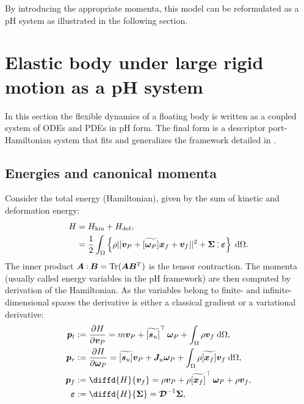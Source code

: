 \documentclass{svjour3}                     %
\DeclareMathOperator{\Tr}{Tr}
\newcommand{\crmat}[1]{\ensuremath{\widetilde{\left[#1\right]}}}
\def\onedot{$\mathsurround0pt\ldotp$}
\def\cddot{%
	\mathbin{\vcenter{\baselineskip.67ex
			\hbox{\onedot}\hbox{\onedot}}%
}}
\begin{document}
	By introducing the appropriate momenta, this model can be reformulated as a pH system as illustrated in the following section.
	
	
	\section{Elastic body under large rigid motion as a pH system}
	\label{sec:pH_fd}
	In this section the flexible dynamics of a floating body is written as a coupled system of ODEs and PDEs in pH form. The final form is a descriptor port-Hamiltonian system that fits and generalizes the framework detailed in \cite{beattie2018linear,mehrmann2019structurepreserving}.  
	
	\subsection{Energies and canonical momenta}
	Consider the total energy (Hamiltonian), given by the sum of kinetic and deformation energy:
	\begin{equation}
	\label{eq:H}
	\begin{aligned}
	H &= H_{\text{kin}} + H_{\text{def}}, \\
	&= \frac{1}{2} \int_{\Omega} \left\{\rho ||\bm{v}_P + \crmat{\bm{\omega}_P} \bm{x}_f + {\bm{v}}_f||^2 + \bm\Sigma \cddot \bm\varepsilon \right\}  \d{\Omega}.
	\end{aligned}
	\end{equation}
	The inner product $\bm{A} \cddot \bm{B} = \Tr(\bm{A} \bm{B}^T)$ is the tensor contraction.  
	The momenta (usually called energy variables in the pH framework) are then computed by derivation of the Hamiltonian. As the variables belong to finite- and infinite-dimensional spaces the derivative is either a classical gradient or a variational derivative:
	\begin{equation}
	\label{eq:momenta}
	\begin{aligned}
	\bm{p}_t &:= \diffp{H}{\bm{v}_P} = m \bm{v}_P + \crmat{\bm{s}_u}^\top \, \bm\omega_P + \int_{\Omega} \rho \bm{v}_f \d{\Omega}, \\
	\bm{p}_r &:= \diffp{H}{\bm\omega_P} = \crmat{\bm{s}_u} \bm{v}_P + \bm{J}_u \bm\omega_P + \int_{\Omega} \rho \crmat{\bm{x}_f} \bm{v}_f \d{\Omega}, \\
	\bm{p}_f &:= \diffd{H}{\bm{v}_f} = \rho \bm{v}_P + \rho \crmat{\bm{x}_f}^\top \, \bm\omega_P + \rho \bm{v}_f, \\
	\bm\varepsilon &:= \diffd{H}{\bm\Sigma} = \bm{\mathcal{D}}^{-1} \bm\Sigma,
	\end{aligned}
	\end{equation}
\end{document}
